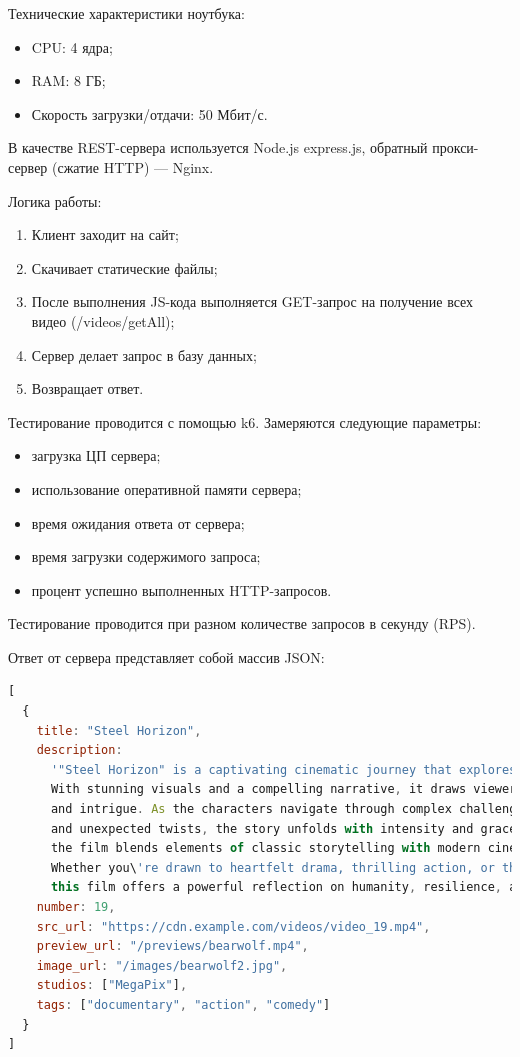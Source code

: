 \documentclass[12pt]{article}
\begin{document}
Технические характеристики ноутбука:
\begin{itemize}
    \item CPU: 4 ядра;
    \item RAM: 8 ГБ;
    \item Скорость загрузки/отдачи: 50 Мбит/с.
\end{itemize}

В качестве REST-сервера используется Node.js express.js, обратный прокси-сервер (сжатие HTTP) — Nginx.

Логика работы:
\begin{enumerate}
    \item Клиент заходит на сайт;
    \item Скачивает статические файлы;
    \item После выполнения JS-кода выполняется GET-запрос на получение всех видео (/videos/getAll);
    \item Сервер делает запрос в базу данных;
    \item Возвращает ответ.
\end{enumerate}

Тестирование проводится с помощью k6. Замеряются следующие параметры:
\begin{itemize}
    \item загрузка ЦП сервера;
    \item использование оперативной памяти сервера;
    \item время ожидания ответа от сервера;
    \item время загрузки содержимого запроса;
    \item процент успешно выполненных HTTP-запросов.
\end{itemize}

Тестирование проводится при разном количестве запросов в секунду (RPS).

Ответ от сервера представляет собой массив JSON:
\begin{lstlisting}[language=JavaScript]
[
  {
    title: "Steel Horizon",
    description: 
      '"Steel Horizon" is a captivating cinematic journey that explores the boundaries of imagination and reality. 
      With stunning visuals and a compelling narrative, it draws viewers into a richly woven tale full of emotion, suspense, 
      and intrigue. As the characters navigate through complex challenges, deep personal struggles, 
      and unexpected twists, the story unfolds with intensity and grace. Crafted by visionary creators, 
      the film blends elements of classic storytelling with modern cinematic techniques to create an unforgettable experience. 
      Whether you\'re drawn to heartfelt drama, thrilling action, or thought-provoking ideas, 
      this film offers a powerful reflection on humanity, resilience, and discovery.',
    number: 19,
    src_url: "https://cdn.example.com/videos/video_19.mp4",
    preview_url: "/previews/bearwolf.mp4",
    image_url: "/images/bearwolf2.jpg",
    studios: ["MegaPix"],
    tags: ["documentary", "action", "comedy"]
  }
]
\end{lstlisting}
\end{document}
